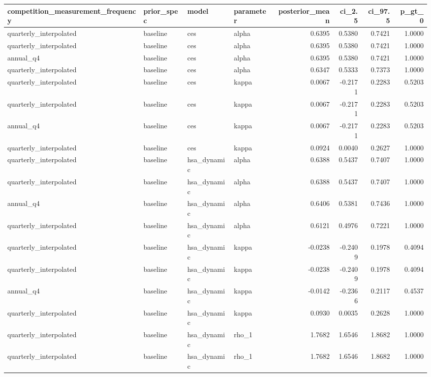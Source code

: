 \begin{tabular}{llllrrrr}
\toprule
competition\_measurement\_frequency & prior\_spec & model & parameter & posterior\_mean & ci\_2.5 & ci\_97.5 & p\_gt\_0 \\
\midrule
quarterly\_interpolated & baseline & ces & alpha & 0.6395 & 0.5380 & 0.7421 & 1.0000 \\
quarterly\_interpolated & baseline & ces & alpha & 0.6395 & 0.5380 & 0.7421 & 1.0000 \\
annual\_q4 & baseline & ces & alpha & 0.6395 & 0.5380 & 0.7421 & 1.0000 \\
quarterly\_interpolated & baseline & ces & alpha & 0.6347 & 0.5333 & 0.7373 & 1.0000 \\
quarterly\_interpolated & baseline & ces & kappa & 0.0067 & -0.2171 & 0.2283 & 0.5203 \\
quarterly\_interpolated & baseline & ces & kappa & 0.0067 & -0.2171 & 0.2283 & 0.5203 \\
annual\_q4 & baseline & ces & kappa & 0.0067 & -0.2171 & 0.2283 & 0.5203 \\
quarterly\_interpolated & baseline & ces & kappa & 0.0924 & 0.0040 & 0.2627 & 1.0000 \\
quarterly\_interpolated & baseline & hsa\_dynamic & alpha & 0.6388 & 0.5437 & 0.7407 & 1.0000 \\
quarterly\_interpolated & baseline & hsa\_dynamic & alpha & 0.6388 & 0.5437 & 0.7407 & 1.0000 \\
annual\_q4 & baseline & hsa\_dynamic & alpha & 0.6406 & 0.5381 & 0.7436 & 1.0000 \\
quarterly\_interpolated & baseline & hsa\_dynamic & alpha & 0.6121 & 0.4976 & 0.7221 & 1.0000 \\
quarterly\_interpolated & baseline & hsa\_dynamic & kappa & -0.0238 & -0.2409 & 0.1978 & 0.4094 \\
quarterly\_interpolated & baseline & hsa\_dynamic & kappa & -0.0238 & -0.2409 & 0.1978 & 0.4094 \\
annual\_q4 & baseline & hsa\_dynamic & kappa & -0.0142 & -0.2366 & 0.2117 & 0.4537 \\
quarterly\_interpolated & baseline & hsa\_dynamic & kappa & 0.0930 & 0.0035 & 0.2628 & 1.0000 \\
quarterly\_interpolated & baseline & hsa\_dynamic & rho\_1 & 1.7682 & 1.6546 & 1.8682 & 1.0000 \\
quarterly\_interpolated & baseline & hsa\_dynamic & rho\_1 & 1.7682 & 1.6546 & 1.8682 & 1.0000 \\

\end{tabular}
